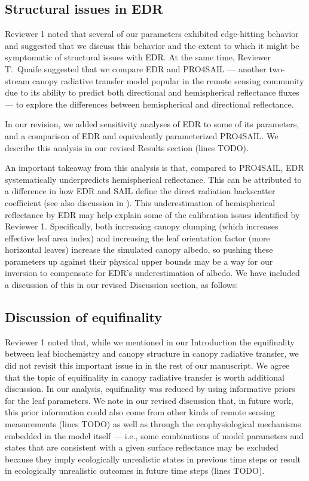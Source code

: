 \documentclass{article}
\begin{document}
\subsection{Structural issues in EDR}\label{subsec:structural}

Reviewer 1 noted that several of our parameters exhibited edge-hitting behavior and suggested that we discuss this behavior and the extent to which it might be symptomatic of structural issues with EDR.\@
At the same time, Reviewer T.\ Quaife suggested that we compare EDR and PRO4SAIL --- another two-stream canopy radiative transfer model popular in the remote sensing community due to its ability to predict both directional and hemispherical reflectance fluxes --- to explore the differences between hemispherical and directional reflectance.

In our revision, we added sensitivity analyses of EDR to some of its parameters, and a comparison of EDR and equivalently parameterized PRO4SAIL.\@
We describe this analysis in our revised Results section (lines TODO).

An important takeaway from this analysis is that, compared to PRO4SAIL, EDR systematically underpredicts hemispherical reflectance.
This can be attributed to a difference in how EDR and SAIL define the direct radiation backscatter coefficient (see also discussion in \citealt{yuan2017reexamination}).
This underestimation of hemispherical reflectance by EDR may help explain some of the calibration issues identified by Reviewer 1.
Specifically, both increasing canopy clumping (which increases effective leaf area index) and increasing the leaf orientation factor (more horizontal leaves) increase the simulated canopy albedo,
so pushing these parameters up against their physical upper bounds may be a way for our inversion to compensate for EDR's underestimation of albedo.
We have included a discussion of this in our revised Discussion section, as follows:

\subsection{Discussion of equifinality}\label{subsec:equifinality}

Reviewer 1 noted that, while we mentioned in our Introduction the equifinality between leaf biochemistry and canopy structure in canopy radiative transfer, we did not revisit this important issue in in the rest of our manuscript.
We agree that the topic of equifinality in canopy radiative transfer is worth additional discussion.
In our analysis, equifinality was reduced by using informative priors for the leaf parameters.
We note in our revised discussion that, in future work, this prior information could also come from other kinds of remote sensing measurements (lines TODO)
as well as through the ecophysiological mechanisms embedded in the model itself --- i.e., some combinations of model parameters and states that are consistent with a given surface reflectance may be excluded because they imply ecologically unrealistic states in previous time steps or result in ecologically unrealistic outcomes in future time steps (lines TODO).
\end{document}
